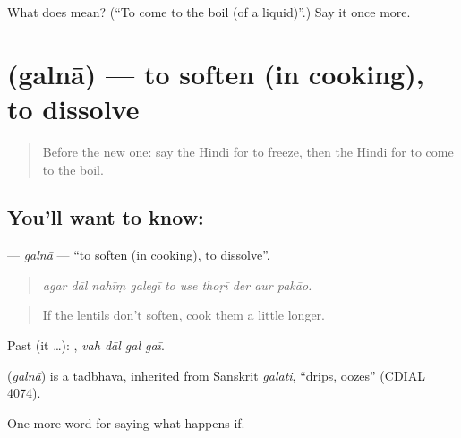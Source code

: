 \begin{tcolorbox}[breakable,colback=teal!4,colframe=teal!35!black,title={Before you move on}]
What does  mean? (\textquotedblleft{}To come to the boil (of a liquid)\textquotedblright{}.) Say it once more.
\end{tcolorbox}
\section[\texorpdfstring{\hi{गलना} (galnā)}{गलना (galnā)}]{ (galnā) — to soften (in cooking), to dissolve}

\label{lesson:HI-C384-galna}



\begin{quote}
Before the new one: say the Hindi for to freeze, then the Hindi for to come to the boil.
\end{quote}

\subsection*{You'll want to know: }
\textbf{} — \emph{galnā} — \textquotedblleft{}to soften (in cooking), to dissolve\textquotedblright{}.

\begin{quote}
         
\end{quote}

\begin{quote}
\emph{agar dāl nahīṃ galegī to use thoṛī der aur pakāo.}
\end{quote}

\begin{quote}
If the lentils don't soften, cook them a little longer.
\end{quote}

Past (it …):    , \emph{vah dāl gal gaī}.

\begin{cousinweb}
\textbf{} (\emph{galnā}) is a tadbhava, inherited from Sanskrit \emph{galati}, \textquotedblleft{}drips, oozes\textquotedblright{} (CDIAL 4074).
\end{cousinweb}

\begin{grammarlens}[title={What you've built}]
One more word for saying what happens if.
\end{grammarlens}

